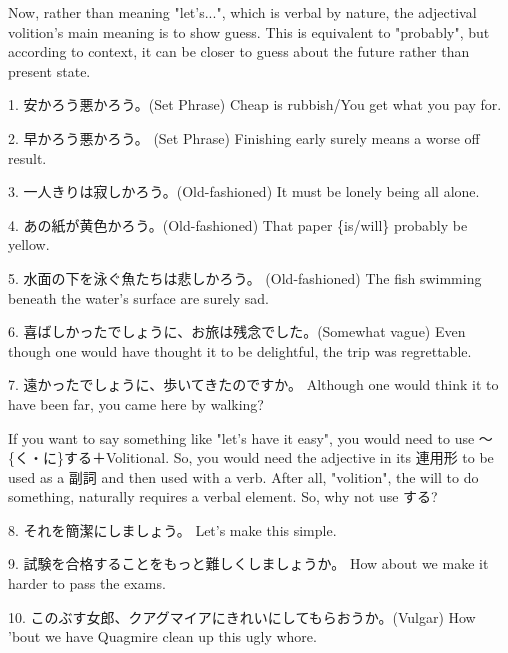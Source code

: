 \par{ Now, rather than meaning "let's\dothyp{}\dothyp{}\dothyp{}", which is verbal by nature, the adjectival volition's main meaning is to show guess. This is equivalent to "probably", but according to context, it can be closer to guess about the future rather than present state. }

\par{1. 安かろう悪かろう。(Set Phrase) \hfill\break
Cheap is rubbish\slash You get what you pay for. }

\par{2. 早かろう悪かろう。 (Set Phrase) \hfill\break
Finishing early surely means a worse off result. }

\par{3. 一人きりは寂しかろう。(Old-fashioned) \hfill\break
It must be lonely being all alone. }

\par{4. あの紙が黄色かろう。(Old-fashioned) \hfill\break
That paper \{is\slash will\} probably be yellow. }

\par{5. 水面の下を泳ぐ魚たちは悲しかろう。 (Old-fashioned) \hfill\break
The fish swimming beneath the water's surface are surely sad. }

\par{6. 喜ばしかったでしょうに、お旅は残念でした。(Somewhat vague) \hfill\break
Even though one would have thought it to be delightful, the trip was regrettable. }
 
\par{7. 遠かったでしょうに、歩いてきたのですか。 \hfill\break
Although one would think it to have been far, you came here by walking? }

\par{ If you want to say something like "let's have it easy", you would need to use ～\{く・に\}する＋Volitional. So, you would need the adjective in its 連用形 to be used as a 副詞 and then used with a verb. After all, "volition", the will to do something, naturally requires a verbal element. So, why not use する? }

\par{8. それを簡潔にしましょう。 \hfill\break
Let's make this simple. }

\par{9. 試験を合格することをもっと難しくしましょうか。 \hfill\break
How about we make it harder to pass the exams. }

\par{10. このぶす女郎、クアグマイアにきれいにしてもらおうか。(Vulgar) \hfill\break
How 'bout we have Quagmire clean up this ugly whore. }

